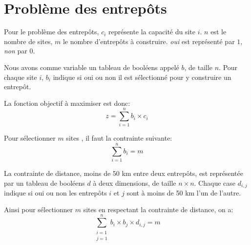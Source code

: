 \documentclass[11pt]{article}
\begin{document}
\section{Probl\`eme des entrep\^ots}
Pour le probl\`eme des entrep\^ots, $c_i$ repr\'esente la capacit\'e du site $i$. $n$ est le nombre de sites, $m$ le nombre d'entrep\^ots \`a construire. \emph{oui} est repr\'esent\'e par $1$, \emph{non} par $0$.

Nous avons comme variable un tableau de bool\'eens appel\'e $b$, de taille $n$. Pour chaque site $i$, $b_i$ indique si oui ou non il est s\'electionn\'e pour y construire un entrep\^ot.

La fonction objectif \`a maximiser est donc: \[z=\sum_{i=1}^{n}b_i\times{}c_i\]

Pour s\'electionner $m$ sites , il faut la contrainte suivante: \[\sum_{i=1}^{n}b_i=m\]

La contrainte de distance, moins de 50 km entre deux entrep\^ots, est repr\'esent\'ee par un tableau de bool\'eens $d$ \`a deux dimensions, de taille $n\times{}n$. Chaque case $d_{i,j}$ indique si oui ou non les entrep\^ots $i$ et $j$ sont \`a moins de 50 km l'un de l'autre.

Ainsi pour s\'electionner $m$ sites en respectant la contrainte de distance, on a: \[\sum_{\substack{i=1 \\ j=1}}^{n}b_i\times{}b_j\times{}d_{i,j}=m\]
\end{document}
